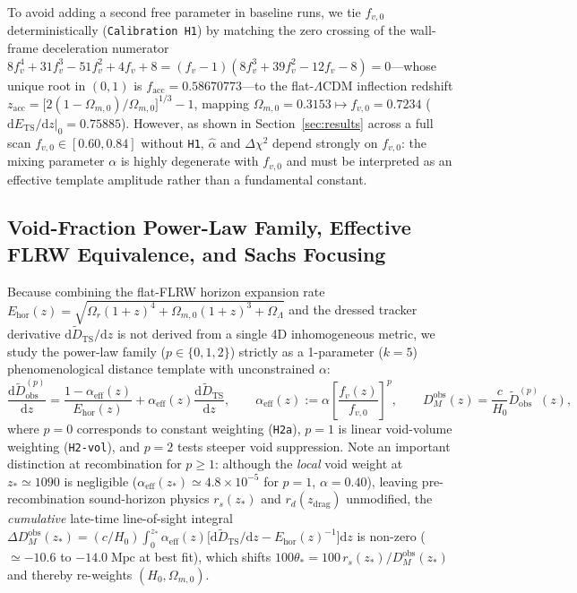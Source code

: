 \documentclass[11pt,a4paper]{article}
\begin{document}
To avoid adding a second free parameter in baseline runs, we tie $f_{v,0}$ deterministically (\texttt{Calibration H1}) by matching the zero crossing of the wall-frame deceleration numerator $8f_v^4 + 31f_v^3 - 51f_v^2 + 4f_v + 8 = (f_v - 1)(8f_v^3 + 39f_v^2 - 12f_v - 8) = 0$---whose unique root in $(0, 1)$ is $f_{\mathrm{acc}} = 0.58670773$---to the flat-$\Lambda$CDM inflection redshift $z_{\mathrm{acc}} = \bigl[2(1-\Omega_{m,0})/\Omega_{m,0}\bigr]^{1/3} - 1$, mapping $\Omega_{m,0} = 0.3153 \mapsto f_{v,0} = 0.7234$ ($\left.\mathrm{d}E_{\mathrm{TS}}/\mathrm{d}z\right|_0 = 0.75885$). However, as shown in Section~\ref{sec:results} across a full scan $f_{v,0} \in [0.60, 0.84]$ without \texttt{H1}, $\hat{\alpha}$ and $\Delta\chi^2$ depend strongly on $f_{v,0}$: the mixing parameter $\alpha$ is highly degenerate with $f_{v,0}$ and must be interpreted as an effective template amplitude rather than a fundamental constant.

\subsection{Void-Fraction Power-Law Family, Effective FLRW Equivalence, and Sachs Focusing}
Because combining the flat-FLRW horizon expansion rate $E_{\mathrm{hor}}(z) = \sqrt{\Omega_r(1+z)^4 + \Omega_{m,0}(1+z)^3 + \Omega_{\Lambda}}$ and the dressed tracker derivative $\mathrm{d}\widetilde{D}_{\mathrm{TS}}/\mathrm{d}z$ is not derived from a single 4D inhomogeneous metric, we study the power-law family ($p \in \{0, 1, 2\}$) strictly as a 1-parameter ($k = 5$) phenomenological distance template with unconstrained $\alpha$:
\begin{equation}
    \frac{\mathrm{d}\widetilde{D}_{\mathrm{obs}}^{(p)}}{\mathrm{d}z} = \frac{1 - \alpha_{\mathrm{eff}}(z)}{E_{\mathrm{hor}}(z)} + \alpha_{\mathrm{eff}}(z)\frac{\mathrm{d}\widetilde{D}_{\mathrm{TS}}}{\mathrm{d}z}, \qquad \alpha_{\mathrm{eff}}(z) := \alpha\left[\frac{f_v(z)}{f_{v,0}}\right]^p, \qquad D_M^{\mathrm{obs}}(z) = \frac{c}{H_0}\widetilde{D}_{\mathrm{obs}}^{(p)}(z),
    \label{eq:h2-vol}
\end{equation}
where $p = 0$ corresponds to constant weighting (\texttt{H2a}), $p = 1$ is linear void-volume weighting (\texttt{H2-vol}), and $p = 2$ tests steeper void suppression. Note an important distinction at recombination for $p \ge 1$: although the \textit{local} void weight at $z_* \simeq 1090$ is negligible ($\alpha_{\mathrm{eff}}(z_*) \simeq 4.8\times 10^{-5}$ for $p = 1$, $\alpha = 0.40$), leaving pre-recombination sound-horizon physics $r_s(z_*)$ and $r_d(z_{\mathrm{drag}})$ unmodified, the \textit{cumulative} late-time line-of-sight integral $\Delta D_M^{\mathrm{obs}}(z_*) = (c/H_0)\int_0^{z_*}\alpha_{\mathrm{eff}}(z)\bigl[\mathrm{d}\widetilde{D}_{\mathrm{TS}}/\mathrm{d}z - E_{\mathrm{hor}}(z)^{-1}\bigr]\mathrm{d}z$ is non-zero ($\simeq -10.6$ to $-14.0\;\mathrm{Mpc}$ at best fit), which shifts $100\theta_* = 100\,r_s(z_*)/D_M^{\mathrm{obs}}(z_*)$ and thereby re-weights $(H_0, \Omega_{m,0})$.
\end{document}
